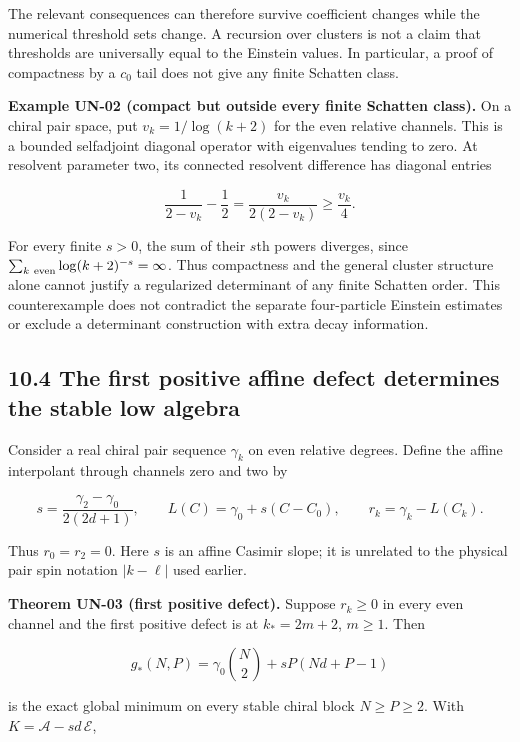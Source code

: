 \documentclass[a4paper,11pt]{article}
\numberwithin{equation}{section}
\begin{document}
The relevant consequences can therefore survive coefficient changes while the numerical threshold sets change. A recursion over clusters is not a claim that thresholds are universally equal to the Einstein values. In particular, a proof of compactness by a \(c_0\) tail does not give any finite Schatten class.

\textbf{Example UN-02 (compact but outside every finite Schatten class).} On a chiral pair space, put \(v_k=1/\log(k+2)\) for the even relative channels. This is a bounded selfadjoint diagonal operator with eigenvalues tending to zero. At resolvent parameter two, its connected resolvent difference has diagonal entries

\[
\frac{1}{2-v_k}-\frac12=\frac{v_k}{2(2-v_k)}
\geq\frac{v_k}{4}.
\]

For every finite \(s>0\), the sum of their \(s\)th powers diverges, since \(\sum_{k\ {\rm even}}\log(k+2)^{-s}=\infty\). Thus compactness and the general cluster structure alone cannot justify a regularized determinant of any finite Schatten order. This counterexample does not contradict the separate four-particle Einstein estimates or exclude a determinant construction with extra decay information.

\hypertarget{the-first-positive-affine-defect-determines-the-stable-low-algebra}{%
\subsection{10.4 The first positive affine defect determines the stable low algebra}\label{the-first-positive-affine-defect-determines-the-stable-low-algebra}}

Consider a real chiral pair sequence \(\gamma_k\) on even relative degrees. Define the affine interpolant through channels zero and two by

\[
s=\frac{\gamma_2-\gamma_0}{2(2d+1)},\qquad
L(C)=\gamma_0+s(C-C_0),\qquad
r_k=\gamma_k-L(C_k).
\]

Thus \(r_0=r_2=0\). Here \(s\) is an affine Casimir slope; it is unrelated to the physical pair spin notation \(|k-\ell|\) used earlier.

\textbf{Theorem UN-03 (first positive defect).} Suppose \(r_k\geq0\) in every even channel and the first positive defect is at \(k_*=2m+2\), \(m\geq1\). Then

\[
g_*(N,P)=\gamma_0\binom N2+sP(Nd+P-1)
\]

is the exact global minimum on every stable chiral block \(N\geq P\geq2\). With \(K=\mathscr A-sd\,\mathcal E\),
\end{document}
